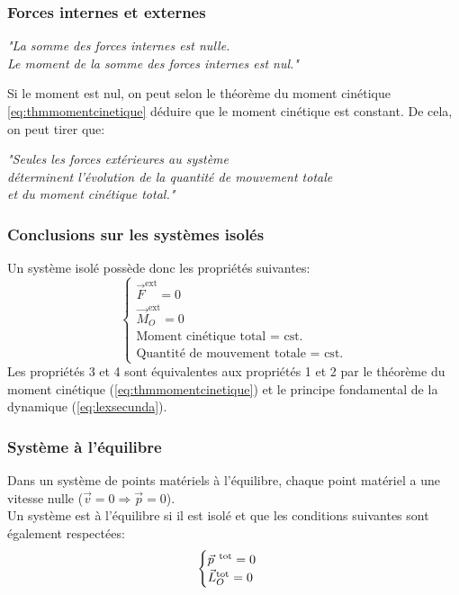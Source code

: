 \documentclass{article}
\numberwithin{equation}{section}
\begin{document}
\subsubsection{Forces internes et externes}
\begin{center}
	\emph{"La somme des forces internes est nulle. \\ Le moment de la somme des forces internes est nul."}
\end{center}
Si le moment est nul, on peut selon le théorème du moment cinétique \ref{eq:thmmomentcinetique} déduire que le moment cinétique est constant.
De cela, on peut tirer que:
\begin{center}
	\emph{"Seules les forces extérieures au système \\ déterminent l'évolution de la quantité de mouvement totale \\ et du moment cinétique total."}
\end{center}

\subsubsection{Conclusions sur les systèmes isolés}
Un système isolé possède donc les propriétés suivantes:
\begin{equation}
	\begin{cases}
		\vec F^{\text{ext}} = 0 \\
		\vec M_O^{\text{ext}} = 0 \\
		\text{Moment cinétique total = cst.} \\
		\text{Quantité de mouvement totale = cst.}
	\end{cases}
\end{equation}
Les propriétés 3 et 4 sont équivalentes aux propriétés 1 et 2 par le théorème du moment cinétique (\ref{eq:thmmomentcinetique}) et le principe fondamental de la dynamique (\ref{eq:lexsecunda}).

\subsubsection{Système à l'équilibre}
Dans un système de points matériels à l'équilibre, chaque point matériel a une vitesse nulle (\( \vec v = 0 \Rightarrow \vec p = 0  \)). \\
Un système est à l'équilibre si il est isolé et que les conditions suivantes sont également respectées:
\begin{equation}
	\begin{cases}
		\vec p^{\text{\, tot}} = 0 \\
		\vec L_O^{\text{tot}} = 0
	\end{cases}
\end{equation}
\end{document}
